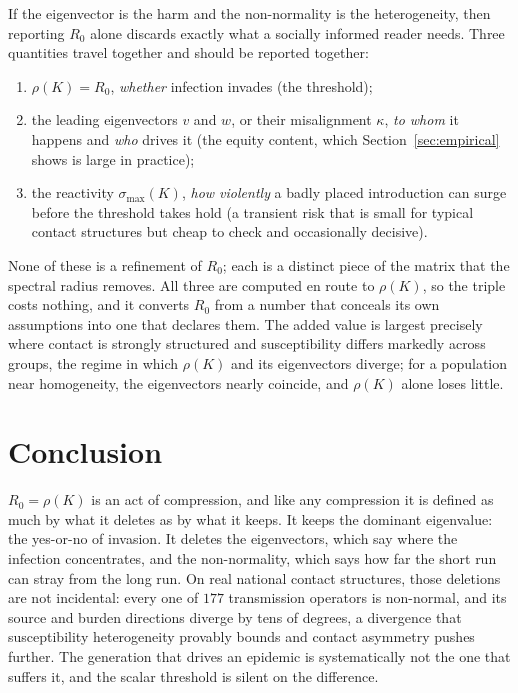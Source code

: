 \documentclass[12pt]{article}
\begin{document}
If the eigenvector is the harm and the non-normality is the heterogeneity, then reporting $R_0$ alone discards exactly what a socially informed reader needs. Three quantities travel together and should be reported together:
\begin{enumerate}
\item $\rho(K)=R_0$, \emph{whether} infection invades (the threshold);
\item the leading eigenvectors $v$ and $w$, or their misalignment $\kappa$, \emph{to whom} it happens and \emph{who} drives it (the equity content, which Section~\ref{sec:empirical} shows is large in practice);
\item the reactivity $\sigma_{\max}(K)$, \emph{how violently} a badly placed introduction can surge before the threshold takes hold (a transient risk that is small for typical contact structures but cheap to check and occasionally decisive).
\end{enumerate}
None of these is a refinement of $R_0$; each is a distinct piece of the matrix that the spectral radius removes. All three are computed en route to $\rho(K)$, so the triple costs nothing, and it converts $R_0$ from a number that conceals its own assumptions into one that declares them. The added value is largest precisely where contact is strongly structured and susceptibility differs markedly across groups, the regime in which $\rho(K)$ and its eigenvectors diverge; for a population near homogeneity, the eigenvectors nearly coincide, and $\rho(K)$ alone loses little.

\section{Conclusion}

$R_0=\rho(K)$ is an act of compression, and like any compression it is defined as much by what it deletes as by what it keeps. It keeps the dominant eigenvalue: the yes-or-no of invasion. It deletes the eigenvectors, which say where the infection concentrates, and the non-normality, which says how far the short run can stray from the long run. On real national contact structures, those deletions are not incidental: every one of $177$ transmission operators is non-normal, and its source and burden directions diverge by tens of degrees, a divergence that susceptibility heterogeneity provably bounds and contact asymmetry pushes further. The generation that drives an epidemic is systematically not the one that suffers it, and the scalar threshold is silent on the difference.
\end{document}
